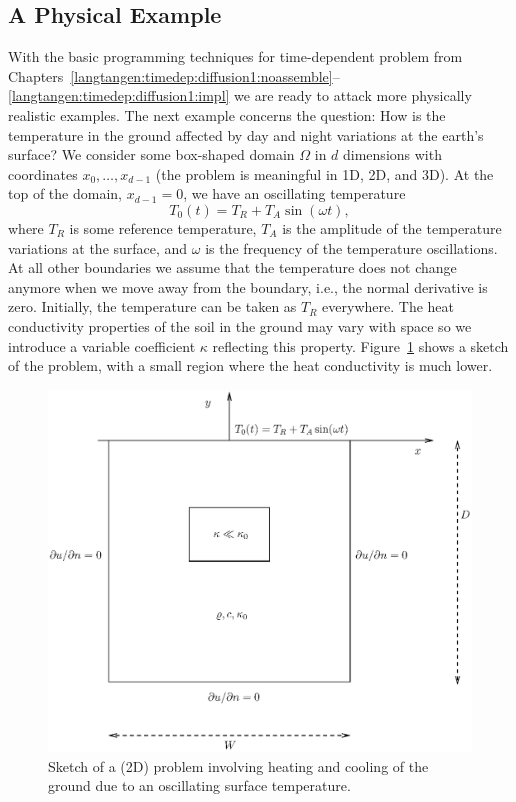 \subsection{A Physical Example}
\label{langtangen:timedep:diffusion2:sin}

With the basic programming techniques for time-dependent problem from
Chapters~\ref{langtangen:timedep:diffusion1:noassemble}--\ref{langtangen:timedep:diffusion1:impl}
we are ready to attack more physically realistic examples.
The next example concerns the question: How is the temperature in the
ground affected by day and night variations at the earth's surface?
We consider some box-shaped domain $\Omega$ in $d$ dimensions with
coordinates $x_0,\ldots,x_{d-1}$ (the problem is meaningful in 1D, 2D, and 3D).
At the top of the domain, $x_{d-1}=0$, we have an oscillating
temperature
\[ T_0(t) = T_R + T_A\sin (\omega t),\]
where $T_R$ is some reference temperature, $T_A$ is the amplitude of
the temperature variations at the surface, and $\omega$ is the frequency
of the temperature oscillations.
At all other boundaries we assume
that the temperature does not change anymore when we move away from
the boundary, i.e., the normal derivative is zero.
Initially, the temperature can be taken as $T_R$ everywhere.
The heat conductivity properties of the soil in the
ground may vary with space so
we introduce a variable coefficient $\kappa$ reflecting this property.
Figure~\ref{langtangen:timedep:diffusion2:sin:fig1} shows a sketch of the
problem, with a small region where the heat conductivity is much lower.
\begin{figure}
\centerline{
\includegraphics[width=0.8\linewidth]{chapters/langtangen/eps/daynight.eps}
  }
  \caption{\label{langtangen:timedep:diffusion2:sin:fig1}
  Sketch of a (2D) problem involving heating and cooling of the ground due
  to an oscillating surface temperature.
  }
\end{figure}


